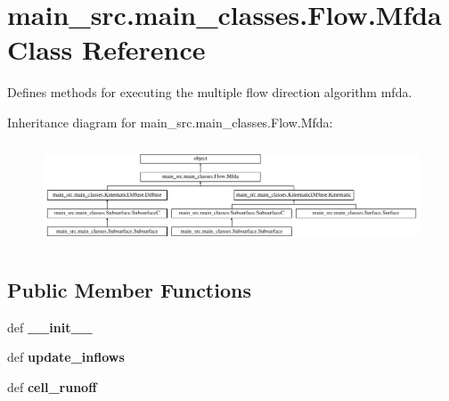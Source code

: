 \hypertarget{classmain__src_1_1main__classes_1_1Flow_1_1Mfda}{\section{main\-\_\-src.\-main\-\_\-classes.\-Flow.\-Mfda Class Reference}
\label{classmain__src_1_1main__classes_1_1Flow_1_1Mfda}
}


Defines methods for executing the multiple flow direction algorithm mfda.  


Inheritance diagram for main\-\_\-src.\-main\-\_\-classes.\-Flow.\-Mfda\-:\begin{figure}[H]
\begin{center}
\leavevmode
\includegraphics[height=3.050109cm]{classmain__src_1_1main__classes_1_1Flow_1_1Mfda}
\end{center}
\end{figure}
\subsection*{Public Member Functions}
\begin{DoxyCompactItemize}
\item 
\hypertarget{classmain__src_1_1main__classes_1_1Flow_1_1Mfda_a7964c154cb5b9748a1f20d9630ce7519}{def {\bfseries \-\_\-\-\_\-init\-\_\-\-\_\-}}\label{classmain__src_1_1main__classes_1_1Flow_1_1Mfda_a7964c154cb5b9748a1f20d9630ce7519}

\item 
\hypertarget{classmain__src_1_1main__classes_1_1Flow_1_1Mfda_a0d6cca4f796f86c170991ea39f02d869}{def {\bfseries update\-\_\-inflows}}\label{classmain__src_1_1main__classes_1_1Flow_1_1Mfda_a0d6cca4f796f86c170991ea39f02d869}

\item 
\hypertarget{classmain__src_1_1main__classes_1_1Flow_1_1Mfda_a87a921b738fffd8e540c3b7b1ff663c6}{def {\bfseries cell\-\_\-runoff}}\label{classmain__src_1_1main__classes_1_1Flow_1_1Mfda_a87a921b738fffd8e540c3b7b1ff663c6}

\end{DoxyCompactItemize}
